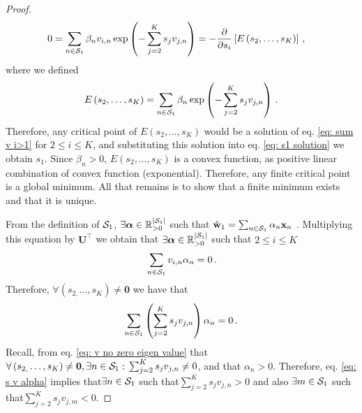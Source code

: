 \documentclass[twoside,11pt,english]{article}
\begin{document}
{\begin{proof}
\begin{align*}
0 & =\sum_{n\in\mathcal{S}_{1}}\beta_{n}v_{i,n}\exp\left(-\sum_{j=2}^{K}s_{j}v_{j,n}\right)=-\frac{\partial}{\partial s_{i}}\left[E\left(s_{2},\dots,s_{K}\right)\right]\,,
\end{align*}
where we defined 
\[
E\left(s_{2},\dots,s_{K}\right)=\sum_{n\in\mathcal{S}_{1}}\beta_{n}\exp\left(-\sum_{j=2}^{K}s_{j}v_{j,n}\right)\,.
\]
Therefore, any critical point of $E\left(s_{2},\dots,s_{K}\right)$
would be a solution of eq. \ref{eq: sum v i>1} for $2\leq i\leq K$,
and substituting this solution into eq. \ref{eq: s1 solution} we
obtain $s_{1}$. Since $\beta_{n}>0$, $E\left(s_{2},\dots,s_{K}\right)$
is a convex function, as positive linear combination of convex function
(exponential). Therefore, any finite critical point is a global minimum.
All that remains is to show that a finite minimum exists and that
it is unique.

From the definition of $\mathcal{S}_{1}$, $\exists\boldsymbol{\alpha}\in\mathbb{R}_{>0}^{\left|\mathcal{S}_{1}\right|}$
such that $\hat{\mathbf{w}}_{1}=\sum_{n\in\mathcal{S}_{1}}\alpha_{n}\mathbf{x}_{n}$
. Multiplying this equation by $\mathbf{U}^{\top}$ we obtain that
$\exists\boldsymbol{\alpha}\in\mathbb{R}_{>0}^{\left|\mathcal{S}_{1}\right|}$
such that $2\leq i\leq K$ 
\begin{equation}
\,\sum_{n\in\mathcal{S}_{1}}v_{i,n}\alpha_{n}=0\,.\label{eq: alpha existence-1}
\end{equation}
Therefore, $\forall\left(s_{2,}\dots,s_{K}\right)\neq\mathbf{0}$
we have that 
\begin{equation}
\sum_{n\in\mathcal{S}_{1}}\left(\sum_{j=2}^{K}s_{j}v_{j,n}\right)\alpha_{n}=0\,.\label{eq: s v alpha}
\end{equation}
Recall, from eq. \ref{eq: v no zero eigen value} that $\forall\left(s_{2,}\dots,s_{K}\right)\neq\mathbf{0},\exists n\in\mathcal{S}_{1}:\,\sum_{j=2}^{K}s_{j}v_{j,n}\neq0$,
and that $\alpha_{n}>0$. Therefore, eq. \ref{eq: s v alpha} implies
that$\exists n\in\mathcal{S}_{1}$ such that$\sum_{j=2}^{K}s_{j}v_{j,n}>0$
and also $\exists m\in\mathcal{S}_{1}$ such that$\sum_{j=2}^{K}s_{j}v_{j,m}<0$.


\end{proof}}
\end{document}
